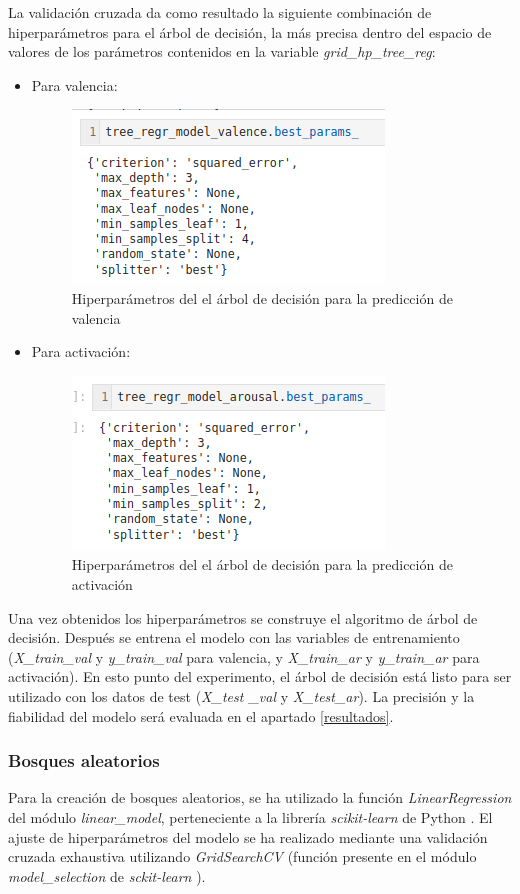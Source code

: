 \documentclass[12pt,a4paper,Spanish]{article}
\begin{document}
La validación cruzada da como resultado la siguiente combinación de hiperparámetros para el árbol de decisión, la más precisa dentro del espacio de valores de los parámetros contenidos en la variable \textit{grid\_hp\_tree\_reg}:
\begin{itemize}
	\item Para valencia:
	\begin{figure}[H]
		\centering
		\includegraphics[width=0.5\linewidth]{figs/final_params_tree}
		\caption{Hiperparámetros del el árbol de decisión para la predicción de valencia}
		\label{fig:finalparamstree}
	\end{figure}
	\item Para activación:
	\begin{figure}[H]
		\centering
		\includegraphics[width=0.5\linewidth]{figs/final_params_tree_arousal}
		\caption{Hiperparámetros del el árbol de decisión para la predicción de activación}
		\label{fig:finalparamstreearousal}
	\end{figure}
\end{itemize}
Una vez obtenidos los hiperparámetros se construye el algoritmo de árbol de decisión. Después se entrena el modelo con las variables de entrenamiento (\textit{X\_train\_val} y \textit{y\_train\_val} para valencia, y \textit{X\_train\_ar} y \textit{y\_train\_ar} para activación).
\newline
En esto punto del experimento, el árbol de decisión está listo para ser utilizado con los datos de test (\textit{X\_test \_val} y \textit{X\_test\_ar}). La precisión y la fiabilidad del modelo será evaluada en el apartado \ref{resultados}.

\subsubsection{Bosques aleatorios}
Para la creación de bosques aleatorios, se ha utilizado la función \textit{LinearRegression} del módulo \textit{linear\_model}, perteneciente a la librería \textit{scikit-learn} de Python \cite{scikit-learn}.
\newline
El ajuste de hiperparámetros del modelo se ha realizado mediante una validación cruzada exhaustiva utilizando \textit{GridSearchCV} (función presente en el módulo \textit{model\_selection} de \textit{sckit-learn} \cite{scikit-learn}).
\end{document}

